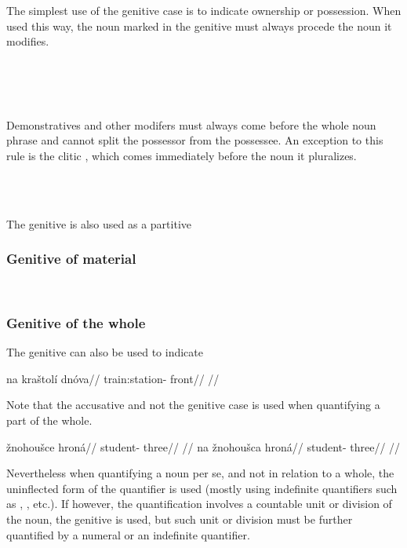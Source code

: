 The simplest use of the genitive case is to indicate ownership or possession.
When used this way, the noun marked in the genitive must always procede the noun
it modifies.

\pex
{}\\
\\
\\
\xe

Demonstratives and other modifers must always come before
the whole noun phrase and cannot split the possessor from the possessee. An
exception to this rule is the clitic , which comes immediately before
the noun it pluralizes.

\pex
\a  {}\\
\a  {}\\
\xe

The genitive is also used as a partitive 


\subsubsection{Genitive of material}

\ex
{}\\
\xe

\subsubsection{Genitive of the whole}
The genitive can also be used to indicate

\pex
\begingl
\gla na kraštolí dnóva//
\glb \Loc{} train:station-\Gen{} front//
\glft {}//
\endgl
\xe

Note that the accusative and not the genitive case is used when quantifying a part of the whole.

\pex
\a
\begingl
\gla *žnohoušce hroná//
\glb student-\Gen{} three//
\glft {}//
\endgl
\a
\begingl
\gla na žnohoušca hroná//
\glb \Loc{} student-\Gen{} three//
\glft {}//
\endgl
\xe

Nevertheless when quantifying a noun per se, and not in relation to a whole, the uninflected form of the quantifier is used (mostly using indefinite quantifiers such as , , etc.). If however, the quantification involves a countable unit or division of the noun, the genitive is used, but such unit or division must be further quantified by a numeral or an indefinite quantifier.

